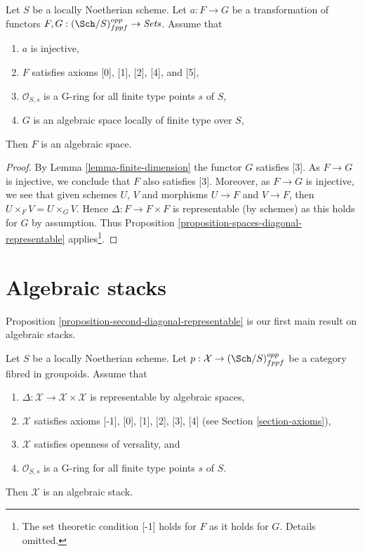 \begin{lemma}
\label{lemma-monomorphism}
Let $S$ be a locally Noetherian scheme. Let $a : F \to G$ be a transformation
of functors $F, G : (\Sch/S)_{fppf}^{opp} \to \textit{Sets}$.
Assume that
\begin{enumerate}
\item $a$ is injective,
\item $F$ satisfies axioms [0], [1], [2], [4], and [5],
\item $\mathcal{O}_{S, s}$ is a G-ring for all finite type points $s$ of $S$,
\item $G$ is an algebraic space locally of finite type over $S$,
\end{enumerate}
Then $F$ is an algebraic space.
\end{lemma}

\begin{proof}
By Lemma \ref{lemma-finite-dimension} the functor $G$ satisfies [3].
As $F \to G$ is injective, we conclude that $F$ also satisfies [3].
Moreover, as $F \to G$ is injective, we see that given schemes
$U$, $V$ and morphisms $U \to F$ and $V \to F$, then
$U \times_F V = U \times_G V$. Hence $\Delta : F \to F \times F$ is
representable (by schemes) as this holds for $G$ by assumption.
Thus Proposition \ref{proposition-spaces-diagonal-representable}
applies\footnote{The set
theoretic condition [-1] holds for $F$ as it holds for $G$. Details
omitted.}.
\end{proof}












\section{Algebraic stacks}
\label{section-algebraic-stacks}

\noindent
Proposition \ref{proposition-second-diagonal-representable} is our first
main result on algebraic stacks.

\begin{lemma}
\label{lemma-diagonal-representable}
Let $S$ be a locally Noetherian scheme. Let
$p : \mathcal{X} \to (\Sch/S)_{fppf}^{opp}$ be a category fibred in groupoids.
Assume that
\begin{enumerate}
\item $\Delta : \mathcal{X} \to \mathcal{X} \times \mathcal{X}$
is representable by algebraic spaces,
\item $\mathcal{X}$ satisfies axioms [-1], [0], [1], [2], [3], [4] (see
Section \ref{section-axioms}),
\item $\mathcal{X}$ satisfies openness of versality, and
\item $\mathcal{O}_{S, s}$ is a G-ring for all finite type points $s$ of $S$.
\end{enumerate}
Then $\mathcal{X}$ is an algebraic stack.
\end{lemma}

